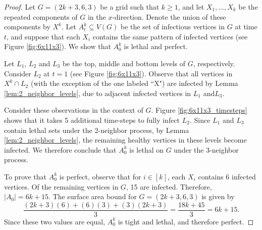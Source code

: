\begin{proof}
Let $G=(2k+3,6,3)$ be a grid such that $k \geq 1$, and let $X_1, \dots, X_{k}$ be the repeated components of $G$ in the $x$-direction. Denote the union of these components by $X^k$. Let $A_t^k \subseteq V(G)$ be the set of infectious vertices in $G$ at time $t$, and suppose that each $X_i$ contains the same pattern of infected vertices (see Figure \ref{fig:6x11x3}). We show that $A_0^k$ is lethal and perfect. 

Let $L_1$, $L_2$ and $L_3$ be the top, middle and bottom levels of $G$, respectively. Consider $L_2$ at $t=1$ (see Figure \ref{fig:6x11x3}). Observe that all vertices in $X^k \cap L_2$ (with the exception of the one labeled ``X") are infected by Lemma \ref{lem:2_neighbor_levels}, due to adjacent infected vertices in $L_1$ and$L_3$. 

Consider these observations in the context of $G$. Figure \ref{fig:6x11x3_timesteps} shows that it takes 5 additional time-steps to fully infect $L_2$. Since $L_1$ and $L_3$ contain lethal sets under the 2-neighbor process, by Lemma \ref{lem:2_neighbor_levels}, the remaining healthy vertices in these levels become infected. We therefore conclude that $A_0^k$ is lethal on $G$ under the 3-neighbor process.

To prove that $A_0^k$ is perfect, observe that for $i \in [k]$, each $X_i$ contains 6 infected vertices. Of the remaining vertices in $G$, 15 are infected. Therefore, $|A_0| = 6k+15$. The surface area bound for $G=(2k+3,6,3)$ is given by
$$\frac{(2k+3)(6) + (6)(3) + (3)(2k+3)}{3} = \frac{18k + 45}{3} = 6k+15.$$
Since these two values are equal, $A_0^k$ is tight and lethal, and therefore perfect.
\end{proof}


